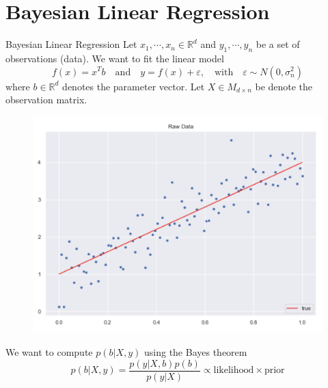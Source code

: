 \documentclass[10pt]{beamer}
\begin{document}
\section{Bayesian Linear Regression}


\begin{frame}{Bayesian Linear Regression}
Let $x_1, \cdots, x_n \in \mathbb{R}^d$ and $y_1, \cdots, y_n$ be a set of observations (data). We want to fit the linear model 
$$
f(x) = x^T b \quad \text{and} \quad y = f(x) + \varepsilon, \quad \text{with} \quad \varepsilon \sim N(0, \sigma_n^2)
$$
where $b \in \mathbb{R}^d$ denotes the parameter vector. Let $X \in M_{d \times n}$ be denote the observation matrix. 
\begin{center}
\begin{figure}
\includegraphics[scale=0.17]{images/lin_raw_data.png} 
\end{figure}
\end{center}
We want to compute $p(b|X, y)$ using the Bayes theorem 
$$
p(b|X, y) = \frac{p(y|X, b) p(b)}{p(y|X) } \propto \text{likelihood} \times \text{prior}
$$
\end{frame}
\end{document}
